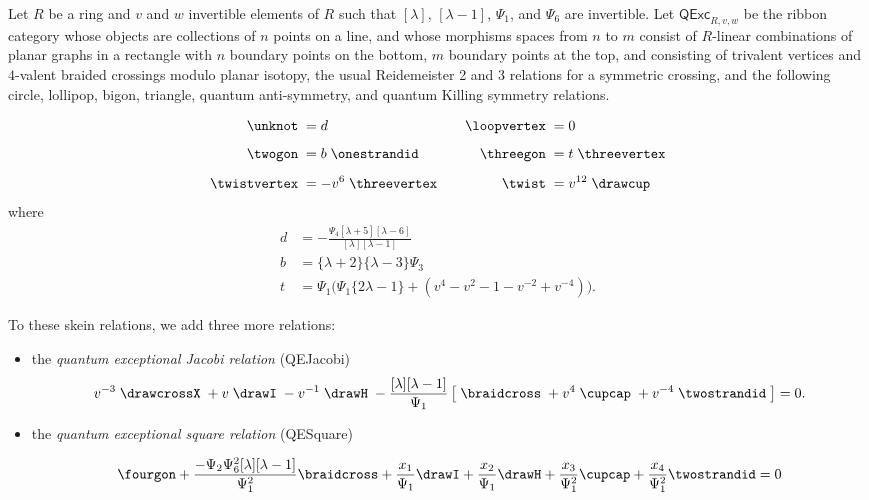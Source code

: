 \documentclass[12pt]{amsart}
\begin{document}
\begin{definition}
Let $R$ be a ring and $v$ and $w$ invertible elements of $R$ such that
$[\lambda]$, $[\lambda-1]$, $\Psi_1$, and $\Psi_6$
are invertible.  Let
$\mathsf{QExc}_{R,v,w}$ be the ribbon category whose objects are collections
of $n$ points on a line, and whose morphisms spaces from $n$ to $m$ consist of
$R$-linear combinations of planar graphs in a rectangle with $n$ boundary
points on the bottom, $m$ boundary points at the top, and consisting of
trivalent vertices and $4$-valent braided crossings modulo planar isotopy, the
usual Reidemeister 2 and 3 relations for a symmetric crossing, and the
following circle, lollipop, bigon, triangle, quantum anti-symmetry, and
quantum Killing symmetry relations.

 \begin{equation}
    \label{eq:simple-rels-spec}
  \begin{aligned}
    \unknot\; &= d&\quad
    \loopvertex\;&=0\\[5pt]
      \twogon\;&= b\;\onestrandid&
        \threegon\; &= t\;\threevertex\\[5pt]
    \twistvertex\; &= -v^{6}\;\threevertex&
      \twist\; &= v^{12}\;\drawcup
  \end{aligned}
  \end{equation}
where
\begin{align*}
  d &= -\frac{\Psi_4 [\lambda+5][\lambda-6]}{[\lambda][\lambda-1]}\\
  b &= \{\lambda+2\}\{\lambda-3\}\Psi_3\\
  t &= \Psi_1 \bigl(\Psi_1 \{2\lambda -1\} + (v^4 - v^2 - 1 - v^{-2} + v^{-4})\bigr).
\end{align*}


To these skein relations, we add three more relations:
\begin{itemize}
\item the \emph{quantum exceptional Jacobi relation} (QEJacobi)
\begin{equation}
v^{-3} \;
\drawcrossX
\;+ v \;
\drawI
\; -v^{-1} \;
 \drawH
\;
 - \frac{[\lambda][\lambda-1]}{\Psi_1}
\left[\; \braidcross \;
 + v^{4}\;
\cupcap
\; + v^{-4} \;
 \twostrandid \;
 \right] = 0.\label{eq:quant-except-spec}
\end{equation}

\item the \emph{quantum exceptional square relation} (QESquare)

\begin{equation}
\label{eq:QESquare-w}
\fourgon + \frac{-\Psi_2\Psi_6^2[\lambda][\lambda-1]}{\Psi_1^2} \braidcross + \frac{x_1}{\Psi_1} \drawI + \frac{x_2}{\Psi_1} \drawH + \frac{x_3}{\Psi_1^2} \cupcap + \frac{x_4}{\Psi_1^2} \twostrandid =0
\end{equation}


\end{itemize}
\end{definition}
\end{document}
